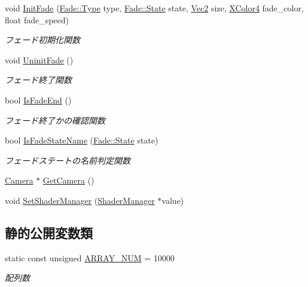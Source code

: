 \begin{DoxyCompactItemize}
void \mbox{\hyperlink{class_back_buffer_add3a034c7758dc6a72bb4582bf6ce78e}{Init\+Fade}} (\mbox{\hyperlink{class_fade_ac06f27215b454aa05b93c236476d6e80}{Fade\+::\+Type}} type, \mbox{\hyperlink{class_fade_ae77826bf3ff2ab95fb7b3b6f95cba80a}{Fade\+::\+State}} state, \mbox{\hyperlink{_vector3_d_8h_a5ef6e95dfc5f9d3820b71772d99bbc25}{Vec2}} size, \mbox{\hyperlink{_vector3_d_8h_a680c30c4a07d86fe763c7e01169cd6cc}{X\+Color4}} fade\+\_\+color, float fade\+\_\+speed)
\begin{DoxyCompactList}\small\item\em フェード初期化関数 \end{DoxyCompactList}\item 
void \mbox{\hyperlink{class_back_buffer_ad3d3626427f53f060f5057ea6a22cac6}{Uninit\+Fade}} ()
\begin{DoxyCompactList}\small\item\em フェード終了関数 \end{DoxyCompactList}\item 
bool \mbox{\hyperlink{class_back_buffer_aab8b2f4a0fdbadccdd9413c12830a377}{Is\+Fade\+End}} ()
\begin{DoxyCompactList}\small\item\em フェード終了かの確認関数 \end{DoxyCompactList}\item 
bool \mbox{\hyperlink{class_back_buffer_a1c13a0de1f95b8f2fea929e9306d426a}{Is\+Fade\+State\+Name}} (\mbox{\hyperlink{class_fade_ae77826bf3ff2ab95fb7b3b6f95cba80a}{Fade\+::\+State}} state)
\begin{DoxyCompactList}\small\item\em フェードステートの名前判定関数 \end{DoxyCompactList}\item 
\mbox{\hyperlink{class_camera}{Camera}} $\ast$ \mbox{\hyperlink{class_back_buffer_addd0da33667c19cfba7f1d81009486f2}{Get\+Camera}} ()
\item 
void \mbox{\hyperlink{class_back_buffer_a44566449a4df988cb1cfe5ffbb0455cc}{Set\+Shader\+Manager}} (\mbox{\hyperlink{class_shader_manager}{Shader\+Manager}} $\ast$value)
\end{DoxyCompactItemize}
\subsection*{静的公開変数類}
\begin{DoxyCompactItemize}
\item 
static const unsigned \mbox{\hyperlink{class_back_buffer_a28e89a0c543b6ae579c8ab75f9917059}{A\+R\+R\+A\+Y\+\_\+\+N\+UM}} = 10000
\begin{DoxyCompactList}\small\item\em 配列数 \end{DoxyCompactList}\end{DoxyCompactItemize}
